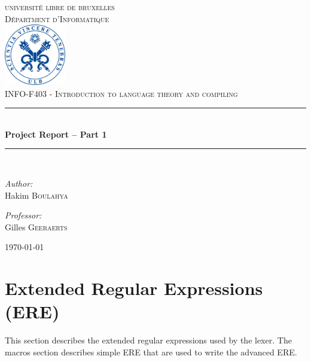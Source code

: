 \documentclass[letterpaper]{article}
\newcommand{\HRule}{\rule{\linewidth}{0.5mm}} %
\begin{document}
\begin{titlepage}
\begin{center}


\textsc{\LARGE universit\'e libre de bruxelles}\\[1.0cm]
\textsc{\Large D\'epartment d'Informatique}\\[1.5cm]

\includegraphics[width=0.2\textwidth]{image/ulblogo.jpg}~\\[1cm]

\textsc{\Large INFO-F403 - Introduction to language theory and compiling
\\[0.3cm]}
\HRule \\[0.4cm]
{ \huge \bfseries Project Report – Part 1  \\[0.4cm] }

\HRule \\[1.5cm]

\noindent
\begin{center} \large

\emph{Author:}\\
Hakim \textsc{Boulahya}\\
\end{center}
\begin{center} \large

\emph{Professor:} \\
Gilles \textsc{Geeraerts}\\

\end{center}

\vfill

{\large \today}

\end{center}
\end{titlepage}

\tableofcontents
\newpage


\section{Extended Regular Expressions (ERE)}
This section describes the extended regular expressions used by the lexer.
The macros section describes simple ERE that are used to write
the advanced ERE.
\end{document}
